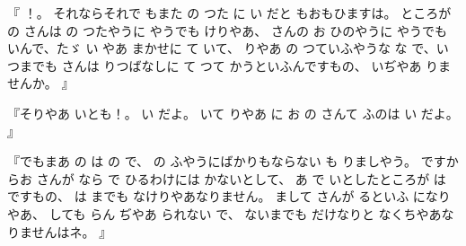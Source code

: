 『
！。
それならそれで
もまた
の
つた
に
い
だと
もおもひますは。
ところが
の
さんは
の
つたやうに
やうでも
けりやあ、
さんの
お
ひのやうに
やうでも
いんで、たゞ
い
やあ
まかせに
て
いて、
りやあ
の
つていふやうな
な
で、いつまでも
さんは
りつばなしに
て
つて
かうといふんですもの、
いぢやあ
りませんか。
』

『そりやあ
いとも！。
い
だよ。
いて
りやあ
に
お
の
さんて
ふのは
い
だよ。
』

『でもまあ
の
は
の
で、
の
ふやうにばかりもならない
も
りましやう。
ですからお
さんが
なら
で
ひるわけには
かないとして、
あ
で
いとしたところが
は
ですもの、
は
までも
なけりやあなりません。
まして
さんが
るといふ
になりやあ、
しても
らん
ぢやあ
られない
で、
ないまでも
だけなりと
なくちやあなりませんはネ。
』

